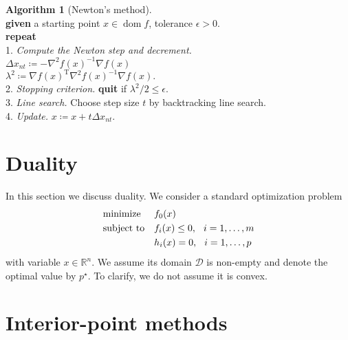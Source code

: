 \documentclass[11pt]{amsart}
\theoremstyle{definition}
\newtheorem{algorithm}{Algorithm}[section]
\theoremstyle{remark}
\newcommand{\ind}{\hspace*{0.5cm}}
\newcommand{\gap}{\hspace*{0.25cm}}
\newcommand{\transpose}{\text{T}}
\DeclareMathOperator{\domain}{dom}
\begin{document}
        \begin{algorithm}[Newton's method]
        \label{a:basic_conceptual_cp_alg}\mbox{}\\
            \ind \textbf{given} a starting point $x \in \domain f$, tolerance $\epsilon > 0.$ \\
            \ind \textbf{repeat} \\
            \ind\ind 1. \emph{Compute the Newton step and decrement.} \\
            \ind\ind\ind $\Delta x_{nt} \coloneqq -\nabla^2 f(x)^{-1} \nabla f(x)$ \\
            \ind\ind\ind $\lambda^2 \coloneqq \nabla f(x)^\transpose \nabla^2 f(x)^{-1} \nabla f(x).$ \\
            \ind\ind 2. \emph{Stopping criterion.} \textbf{quit} if $\lambda^2/2 \leq \epsilon.$\\
            \ind\ind 3. \emph{Line search.} Choose step size $t$ by backtracking line search. \\
            \ind\ind 4. \emph{Update.} $x \coloneqq x + t\Delta x_{nt}.$ \\
        \end{algorithm}

\section{Duality}
    In this section we discuss duality. We consider a standard optimization problem
    \begin{equation}\label{e:opt_problem}
        \begin{aligned}
        & {\text{minimize}} && f_0(x) \\
        & \text{subject to} && f_i(x) \leq 0, \gap i = 1, \dots, m \\
        &                   && h_i(x) = 0, \gap i = 1, \dots, p
        \end{aligned}
    \end{equation}
    with variable $x \in \mathbb{R}^n$. We assume its domain $\mathcal{D}$ is non-empty and denote the optimal value by $p^\star$. To clarify, we do not assume it is convex.  


\section{Interior-point methods} 
\end{document}
